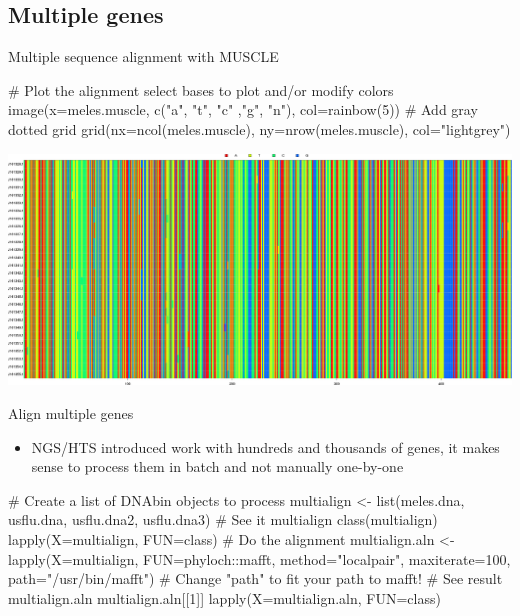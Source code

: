 \documentclass[compress, ucs, xelatex, 11pt, xcolor=svgnames,
	hyperref={
		bookmarks=true,
		unicode=true,
		colorlinks=true,
		pdftitle={Molecular data in R},
		plainpages=false,
		pdfauthor={Vojtech Zeisek},
		pdfsubject={Course about phylogeny and evolution in R},
		pdfcreator={XeLaTeX},
		pdfkeywords={R, evolution, phylogeny, molecular data},
		linkcolor=Tomato,
		anchorcolor=SaddleBrown,
		citecolor=Goldenrod,
		filecolor=DarkMagenta,
		menucolor=Sienna,
		urlcolor=DarkTurquoise,
		pdftex},
	url={hyphens, lowtilde} %
	]{beamer}
\begin{document}
\subsection{Multiple genes}

\begin{frame}[fragile]{Multiple sequence alignment with MUSCLE}
	\begin{spluscode}
    # Plot the alignment select bases to plot and/or modify colors
    image(x=meles.muscle, c("a", "t", "c" ,"g", "n"), col=rainbow(5))
    # Add gray dotted grid
    grid(nx=ncol(meles.muscle), ny=nrow(meles.muscle), col="lightgrey")
	\end{spluscode}
	\vfill
	\includegraphics[width=\textwidth]{muscle.png}
\end{frame}

\begin{frame}[fragile]{Align multiple genes}
	\begin{itemize}
		\item NGS/HTS introduced work with hundreds and thousands of genes, it makes sense to process them in batch and not manually one-by-one
	\end{itemize}
	\begin{spluscode}
    # Create a list of DNAbin objects to process
    multialign <- list(meles.dna, usflu.dna, usflu.dna2, usflu.dna3)
    # See it
    multialign
    class(multialign)
    lapply(X=multialign, FUN=class)
    # Do the alignment
    multialign.aln <- lapply(X=multialign, FUN=phyloch::mafft,
       method="localpair", maxiterate=100, path="/usr/bin/mafft")
      # Change "path" to fit your path to mafft!
    # See result
    multialign.aln
    multialign.aln[[1]]
    lapply(X=multialign.aln, FUN=class)
	\end{spluscode}
\end{frame}
\end{document}
